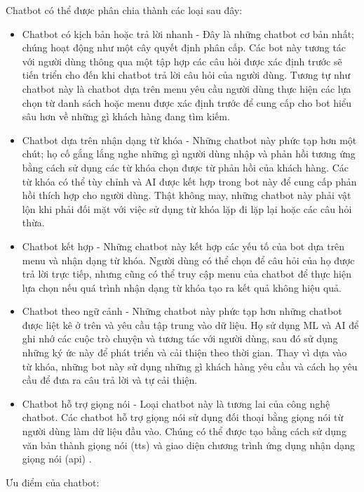 Chatbot có thể được phân chia thành các loại sau đây:
\begin{itemize}
    \item Chatbot có kịch bản hoặc trả lời nhanh - Đây là những chatbot cơ bản nhất; chúng hoạt động như một cây quyết định phân cấp. Các bot này tương tác với người dùng thông qua một tập hợp các câu hỏi được xác định trước sẽ tiến triển cho đến khi chatbot trả lời câu hỏi của người dùng. Tương tự như chatbot này là chatbot dựa trên menu yêu cầu người dùng thực hiện các lựa chọn từ danh sách hoặc menu được xác định trước để cung cấp cho bot hiểu sâu hơn về những gì khách hàng đang tìm kiếm.

    \item Chatbot dựa trên nhận dạng từ khóa - Những chatbot này phức tạp hơn một chút; họ cố gắng lắng nghe những gì người dùng nhập và phản hồi tương ứng bằng cách sử dụng các từ khóa chọn được từ phản hồi của khách hàng. Các từ khóa có thể tùy chỉnh và AI được kết hợp trong bot này để cung cấp phản hồi thích hợp cho người dùng. Thật không may, những chatbot này phải vật lộn khi phải đối mặt với việc sử dụng từ khóa lặp đi lặp lại hoặc các câu hỏi thừa.

    \item Chatbot kết hợp - Những chatbot này kết hợp các yếu tố của bot dựa trên menu và nhận dạng từ khóa. Người dùng có thể chọn để câu hỏi của họ được trả lời trực tiếp, nhưng cũng có thể truy cập menu của chatbot để thực hiện lựa chọn nếu quá trình nhận dạng từ khóa tạo ra kết quả không hiệu quả.

    \item Chatbot theo ngữ cảnh - Những chatbot này phức tạp hơn những chatbot được liệt kê ở trên và yêu cầu tập trung vào dữ liệu. Họ sử dụng ML và AI để ghi nhớ các cuộc trò chuyện và tương tác với người dùng, sau đó sử dụng những ký ức này để phát triển và cải thiện theo thời gian. Thay vì dựa vào từ khóa, những bot này sử dụng những gì khách hàng yêu cầu và cách họ yêu cầu để đưa ra câu trả lời và tự cải thiện.

    \item Chatbot hỗ trợ giọng nói - Loại chatbot này là tương lai của công nghệ chatbot. Các chatbot hỗ trợ giọng nói sử dụng đối thoại bằng giọng nói từ người dùng làm dữ liệu đầu vào. Chúng có thể được tạo bằng cách sử dụng văn bản thành giọng nói (\ac{tts}) và giao diện chương trình ứng dụng nhận dạng giọng nói (\ac{api}) \cite{chat-bot}.

\end{itemize}
Ưu điểm của chatbot:
